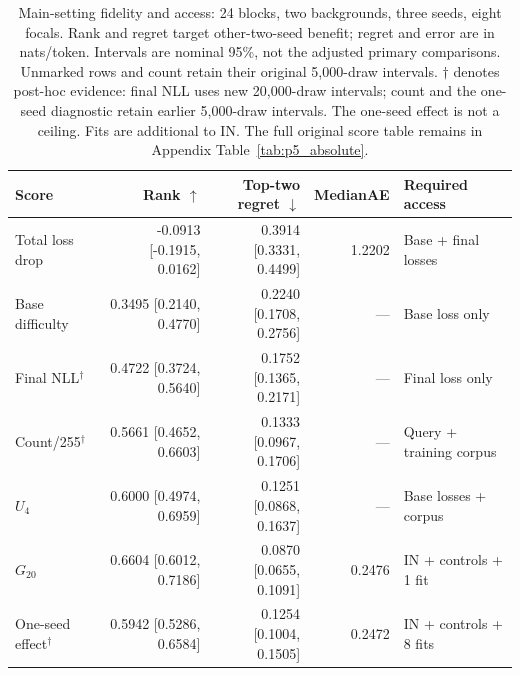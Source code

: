\begin{table}[tp]
\centering
\footnotesize
\setlength{\tabcolsep}{3pt}
\begin{tabular}{lrrrl}
\toprule
Score & Rank $\uparrow$ & Top-two regret $\downarrow$ & MedianAE & Required access \\
\midrule
Total loss drop & -0.0913 [-0.1915, 0.0162] & 0.3914 [0.3331, 0.4499] & 1.2202 & Base + final losses \\
Base difficulty & 0.3495 [0.2140, 0.4770] & 0.2240 [0.1708, 0.2756] & --- & Base loss only \\
Final NLL$^\dagger$ & 0.4722 [0.3724, 0.5640] & 0.1752 [0.1365, 0.2171] & --- & Final loss only \\
Count/255$^\dagger$ & 0.5661 [0.4652, 0.6603] & 0.1333 [0.0967, 0.1706] & --- & Query + training corpus \\
$U_4$ & 0.6000 [0.4974, 0.6959] & 0.1251 [0.0868, 0.1637] & --- & Base losses + corpus \\
$G_{20}$ & 0.6604 [0.6012, 0.7186] & 0.0870 [0.0655, 0.1091] & 0.2476 & IN + controls + 1 fit \\
One-seed effect$^\dagger$ & 0.5942 [0.5286, 0.6584] & 0.1254 [0.1004, 0.1505] & 0.2472 & IN + controls + 8 fits \\
\bottomrule
\end{tabular}
\caption{Main-setting fidelity and access: 24 blocks, two backgrounds, three seeds, eight focals. Rank and regret target other-two-seed benefit; regret and error are in nats/token. Intervals are nominal 95\%, not the adjusted primary comparisons. Unmarked rows and count retain their original 5,000-draw intervals. $\dagger$ denotes post-hoc evidence: final NLL uses new 20,000-draw intervals; count and the one-seed diagnostic retain earlier 5,000-draw intervals. The one-seed effect is not a ceiling. Fits are additional to IN. The full original score table remains in Appendix Table~\ref{tab:p5_absolute}.}
\label{tab:review_fidelity}
\end{table}
